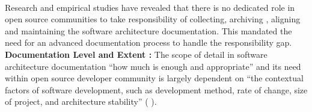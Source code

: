 \\\indent Research and empirical studies \cite{6923128} have revealed that there is no dedicated role in open source communities to take responsibility of collecting, archiving , aligning and maintaining the software architecture documentation. This mandated the need for an advanced documentation process to handle the responsibility gap.
\newline
\\\indent \textbf{Documentation Level and Extent : } The scope of detail in software architecture documentation \enquote{how much is enough and appropriate} and its need within open source developer community is largely dependent on \enquote{the contextual factors of software development, such as development method, rate of change, size of project, and architecture stability} (\cite{SMR:SMR572} \cite{Briand2003}).
